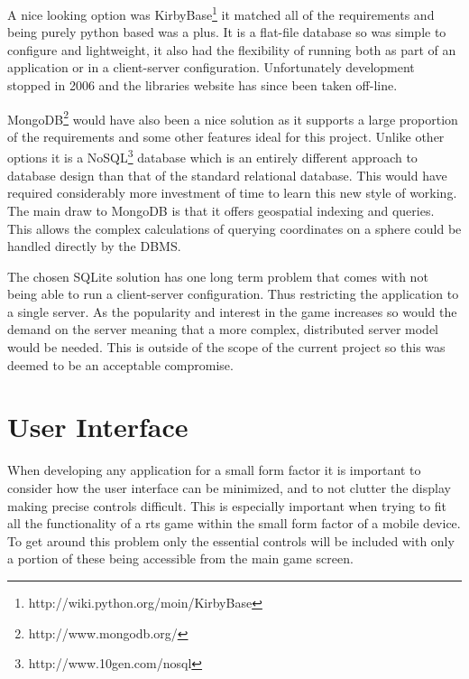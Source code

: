 A nice looking option was KirbyBase\footnote{http://wiki.python.org/moin/KirbyBase} it matched all of the requirements and being purely python based was a plus. It is a flat-file database so was simple to configure and lightweight, it also had the flexibility of running both as part of an application or in a client-server configuration. Unfortunately development stopped in 2006 and the libraries website has since been taken off-line.

MongoDB\footnote{http://www.mongodb.org/} would have also been a nice solution as it supports a large proportion of the requirements and some other features ideal for this project. Unlike other options it is a NoSQL\footnote{http://www.10gen.com/nosql} database which is an entirely different approach to database design than that of the standard relational database. This would have required considerably more investment of time to learn this new style of working. The main draw to MongoDB is that it offers geospatial indexing and queries. This allows the complex calculations of querying coordinates on a sphere could be handled directly by the DBMS.

The chosen SQLite solution has one long term problem that comes with not being able to run a client-server configuration. Thus restricting the application to a single server. As the popularity and interest in the game increases so would the demand on the server meaning that a more complex, distributed server model would be needed. This is outside of the scope of the current project so this was deemed to be an acceptable compromise.

\section{User Interface}
When developing any application for a small form factor it is important to consider how the user interface can be minimized, and to not clutter the display making precise controls difficult. This is especially important when trying to fit all the functionality of a \gls{rts} game within the small form factor of a mobile device. To get around this problem only the essential controls will be included with only a portion of these being accessible from the main game screen.

